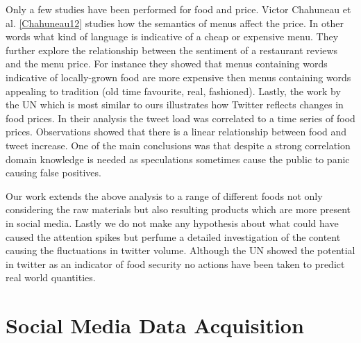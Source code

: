 Only a few studies have been performed for food and price. Victor Chahuneau et al. \ref{Chahuneau12} studies how the semantics of menus affect the price. In other words what kind of language is indicative of a cheap or expensive menu. They further explore the relationship between the sentiment of a restaurant reviews and the menu price. For instance they showed that menus containing words indicative of locally-grown food are more expensive then menus containing words appealing to tradition (old time favourite, real, fashioned). Lastly, the work by the UN  \cite{ungp2013} which is most similar to ours illustrates how Twitter reflects changes in food prices. In their analysis the tweet load was correlated to a time series of food prices. Observations showed that there is a linear relationship between food and tweet increase. One of the main conclusions was that despite a strong correlation domain knowledge is needed as speculations sometimes cause the public to panic causing false positives. 

Our work extends the above analysis to a range of different foods not only considering the raw materials but also resulting products which are more present in social media. Lastly we do not make any hypothesis about what could have caused the attention spikes but perfume a detailed investigation of the content causing the fluctuations in twitter volume. Although the UN showed the potential in twitter as an indicator of food security no actions have been taken to predict real world quantities. 




\chapter{Social Media Data Acquisition}
\label{3}

